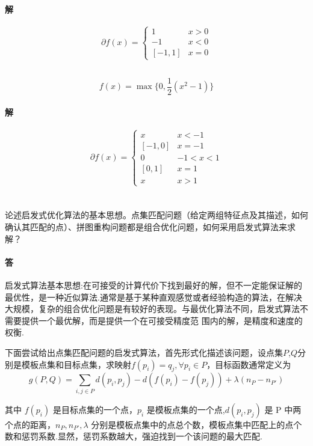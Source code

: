 \documentclass[a4paper]{article}
\begin{document}
\paragraph{解}
\[\partial f(x) = \left\{\begin{array}{cl}
  1 & x > 0\\
  -1 & x < 0\\
  \left[-1,1\right] & x = 0
\end{array}\right.\]

\subsection{}
\[f(x) = \max\{0,\frac{1}{2}(x^2 - 1)\}\]
\paragraph{解}
\[\partial f(x) = \left\{\begin{array}{cl}
  x & x < -1 \\
  \left[-1,0\right] & x = -1\\
  0 & -1 < x < 1\\
  \left[0,1\right] & x = 1\\
  x & x > 1
\end{array}\right.\]

\section{}
论述启发式优化算法的基本思想。点集匹配问题（给定两组特征点及其描述，如何确认其匹配的点）、拼图重构问题都是组合优化问题，如何采用启发式算法来求解？ 

\paragraph{答}
启发式算法基本思想:在可接受的计算代价下找到最好的解，但不一定能保证解的最优性，是一种近似算法.通常是基于某种直观感觉或者经验构造的算法，在解决大规模，复杂的组合优化问题是有较好的表现。与最优化算法不同，启发式算法不需要提供一个最优解，而是提供一个在可接受精度范
围内的解，是精度和速度的权衡.

下面尝试给出点集匹配问题的启发式算法，首先形式化描述该问题，设点集$P$,$Q$分别是模板点集和目标点集，求映射\(f(p_i)=q_j,\forall p_i \in P\)，目标函数通常定义为
\[g(P,Q)=\sum_{i,j \in P} d(p_i,p_j)-d(f(p_i)- f(p_j))+\lambda(n_P -n_{P'})\]

其中 \(f(p_i)\) 是目标点集的一个点，$p_i$ 是模板点集的一个点,$d(p_i,p_j)$ 是 P 中两个点的距离，$n_P,n_{P'},\lambda$ 分别是模板点集中的点总个数，模板点集中匹配上的点个数和惩罚系数.显然，惩罚系数越大，强迫找到一个该问题的最大匹配.
\end{document}
